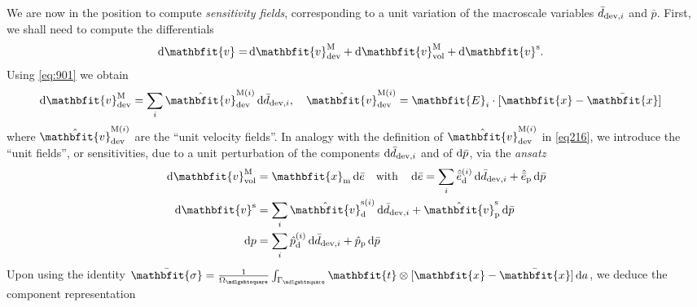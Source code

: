 \documentclass[12pt,a4paper,fleqn]{article}
\renewcommand{\ta}[1]{\mathbfit{#1}}
\renewcommand{\ts}[1]{\mathbfit{#1}}
\renewcommand{\Box}{\mdlgwhtsquare}
\newcommand{\ded}{\mathrm{d}}
\newcommand{\dep}{\mathrm{p}}
\begin{document}
We are now in the position to compute \emph{sensitivity fields}, corresponding to a unit variation of the macroscale variables $\bar{d}_{\mathrm{dev},i}$ and $\bar{p}$. First, we shall need to compute the differentials
\begin{align}
    \dif\ta{v}
     = &
    \dif\ta{v}^\macro_\dev + \dif\ta{v}^\macro_\vol + \dif\ta{v}^\fluct.
\label{eq:dv}
\end{align}
Using \eqref{eq:901} we obtain
\begin{align}
  \dif \ta{v}^{\macro}_\dev &= \sum_{i} \hat{\ta{v}}^{\macro(i)}_\dev \dif\bar{d}_{\dev,i}, \quad  \hat{\ta{v}}^{\macro(i)}_\dev = \ts E_i \cdot [\ta x - \bar{\ta x}]
\label{eq216}
\end{align}
where $\hat{\ta{v}}^{\macro(i)}_\dev$ are the ``unit velocity fields''. In analogy with the definition of $\hat{\ta{v}}^{\macro(i)}_\dev$
in \eqref{eq216}, we introduce the ``unit fields'', or sensitivities, due to a unit perturbation of the components $\operatorname{d \!}\bar{d}_{\mathrm{dev},i}$ and of $\operatorname{d \!}\bar{p}$, via the \emph{ansatz}
\begin{align}
    \dif\ta{v}^\macro_\vol & = \ta x_\mean \dif \bar{e} \quad\mbox{with}\quad
    \dif\bar{e} = \sum_i \hat{\bar{e}}_{\ded}^{(i)}\dif\bar{d}_{\dev,i} + \hat{\bar{e}}_{\dep} \dif \bar{p}
\\
    \dif\ta v^\fluct &= \sum_i \hat{\ta{v}}_{\ded}^{\fluct(i)}\dif\bar{d}_{\dev,i} + \hat{\ta v}_{\dep}^\fluct \dif \bar{p}
\\
    \dif p  &= \sum_i \hat{p}^{(i)}_{\ded}\dif\bar{d}_{\dev,i} + \hat{p}_{\dep} \dif \bar{p}
\end{align}
Upon using the identity $\bar{\ts\sigma}=\frac{1}{\Omega_\Box} \int_{\Gamma_\Box} \ts t \outerp [\ta x - \bar{\ta x}]\dif a$, we deduce the component representation
\end{document}
